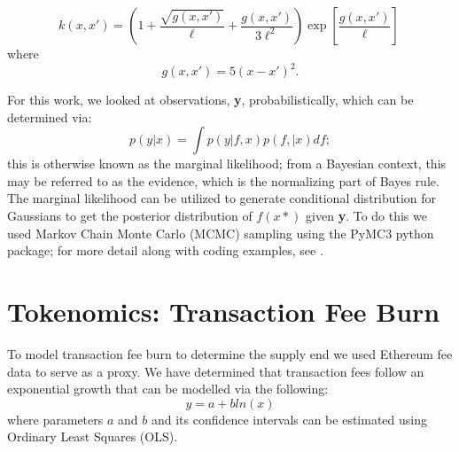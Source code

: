 \documentclass[peerreview]{ieeesyscoin}
\begin{document}
\begin{equation}
k(x,x') = \left( 1 + \dfrac{\sqrt{g(x,x')}}{\ell} + \dfrac{g(x,x')}{3\ell^2}\right)\exp\left[ \dfrac{g(x,x')}{\ell} \right]\ 
\end{equation}
where
\begin{equation}
	g(x,x') = 5(x-x')^2.
\end{equation}

For this work, we looked at observations, \textbf{y}, probabilistically, which can be determined via:
\begin{equation}
p(y|x) = \int p(y | f,x) p (f, |x) df;
\end{equation}
this is otherwise known as the marginal likelihood; from a Bayesian context, this may be referred to as the evidence, which is the normalizing part of Bayes rule. The marginal likelihood can be utilized to generate conditional distribution for Gaussians to get the posterior distribution of $f(x*)$ given \textbf{y}. To do this we used Markov Chain Monte Carlo (MCMC) sampling using the PyMC3 python package; for more detail along with coding examples, see \cite{Fon20}.

\section{Tokenomics: Transaction Fee Burn}
\label{appendix:tx_fee_burn}

To model transaction fee burn to determine the supply end we used Ethereum fee data to serve as a proxy. We have determined that transaction fees follow an exponential growth that can be modelled via the following:
\begin{equation}
y = a + bln(x)
\end{equation}
where parameters $a$ and $b$ and its confidence intervals can be estimated using Ordinary Least Squares (OLS).
\end{document}
